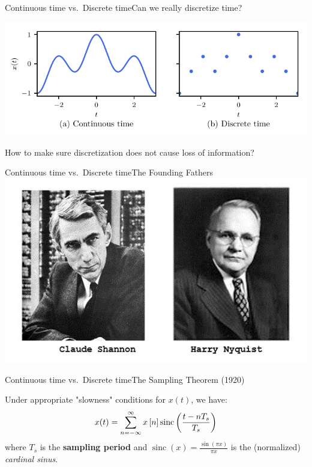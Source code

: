 \documentclass[usenames,dvipsnames,svgnames,10pt,aspectratio=169]{beamer}
\DeclareMathOperator{\sinc}{sinc}
\begin{document}
\begin{frame}[t, c]{Continuous time vs.\ Discrete time}{Can we really discretize time?}
	\centering

	\includegraphics[width=.75\textwidth]{Continuous_vs_Discrete}

	How to make sure discretization does not cause loss of information?
\end{frame}

\begin{frame}[t, c]{Continuous time vs.\ Discrete time}{The Founding Fathers}
	\centering
	\includegraphics[height=.75\textheight]{Nyquist_Shannon}
\end{frame}


\begin{frame}[t, c]{Continuous time vs.\ Discrete time}{The Sampling Theorem (1920)}

	Under appropriate "slowness" conditions for $x(t)$, we have:
	\begin{equation}
		x(t) = \sum_{n=-\infty}^{\infty} x \left[ n \right] \sinc \left( \displaystyle \frac{t - n T_s}{T_s} \right)
		\notag
	\end{equation}
	where $T_s$ is the \alert{\textbf{sampling period}} and $\displaystyle \sinc(x) = \frac{\sin(\pi x)}{\pi x}$ is the (normalized) \emph{cardinal sinus}.

\end{frame}
\end{document}
